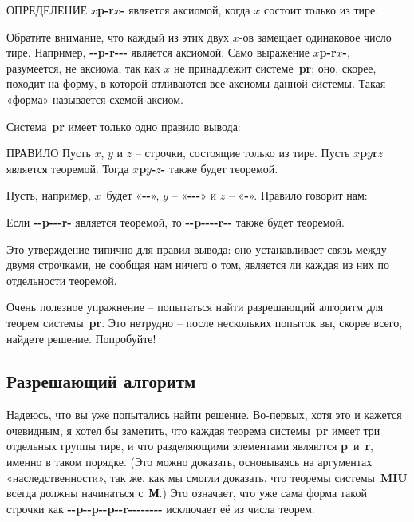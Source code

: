 \documentclass[../main.tex]{subfiles}
\begin{document}
\begin{mybox}{ОПРЕДЕЛЕНИЕ}
    \textbf{$x$p-r$x$-} является аксиомой, когда $x$ состоит только из тире.
\end{mybox}

Обратите внимание, что каждый из этих двух $x$-ов замещает одинаковое число тире. Например, \textbf{-{}-p-r-{}-{}-} является аксиомой. Само выражение \textbf{$x$p-r$x$-}, разумеется, не аксиома, так как $x$ не принадлежит системе~\textbf{pr}; оно, скорее, походит на форму, в которой отливаются все аксиомы данной системы. Такая «форма» называется схемой аксиом.

Система~\textbf{pr} имеет только одно правило вывода:

\begin{mybox}{ПРАВИЛО}
    Пусть $x$, $y$ и $z$ \--- строчки, состоящие только из тире.
    Пусть \textbf{$x$p$y$r$z$} является теоремой.
    Тогда \textbf{$x$p$y$-$z$-} также будет теоремой.
\end{mybox}

\noindent
Пусть, например, $x$~будет «\textbf{-{}-}», $y$ \--- «\textbf{-{}-{}-}» и $z$ \--- «\textbf{-}».
Правило говорит нам:

\begin{block}
    Если \textbf{-{}-p-{}-{}-r-} является теоремой, то \textbf{-{}-p-{}-{}-{}-r-{}-} также будет теоремой.
\end{block}

Это утверждение типично для правил вывода: оно устанавливает связь между двумя строчками, не сообщая нам ничего о том, является ли каждая из них по отдельности теоремой.

Очень полезное упражнение \--- попытаться найти разрешающий алгоритм для теорем системы~\textbf{pr}. Это нетрудно \--- после нескольких попыток вы, скорее всего, найдете решение. Попробуйте!


\subsection{Разрешающий алгоритм}

Надеюсь, что вы уже попытались найти решение. Во-первых, хотя это и кажется очевидным, я хотел бы заметить, что каждая теорема системы~\textbf{pr} имеет три отдельных группы тире, и что разделяющими элементами являются \textbf{p}~и~\textbf{r}, именно в таком порядке. (Это можно доказать, основываясь на аргументах «наследственности», так же, как мы смогли доказать, что теоремы системы~\textbf{MIU} всегда должны начинаться с~\textbf{М}.) Это означает, что уже сама форма такой строчки как \textbf{-{}-p-{}-p-{}-p-{}-r-{}-{}-{}-{}-{}-{}-{}-} исключает её из числа теорем.
\end{document}
